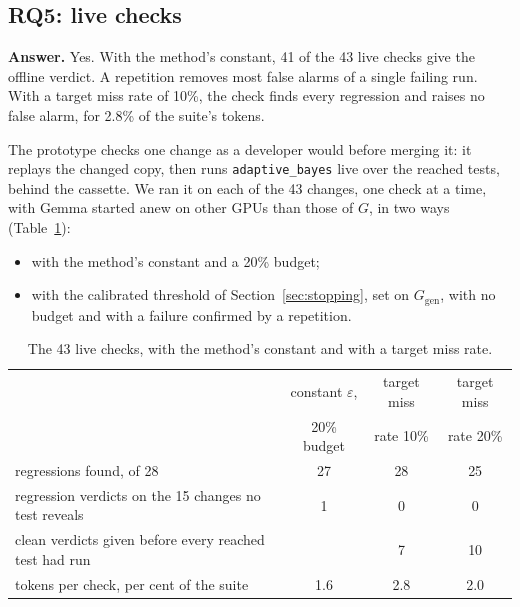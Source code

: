 \documentclass[11pt,a4paper]{article}
\newcommand{\strat}[1]{\texttt{#1}}
\newcommand{\answer}[1]{\noindent\textbf{Answer.} #1\par\smallskip}
\begin{document}
\subsection{RQ5: live checks}

\answer{Yes. With the method's constant, 41 of the 43 live checks give the offline verdict. A repetition removes
most false alarms of a single failing run. With a target miss rate of 10\%, the check finds every regression and
raises no false alarm, for 2.8\% of the suite's tokens.}

The prototype checks one change as a developer would before merging it: it replays the changed copy, then runs
\strat{adaptive\_bayes} live over the reached tests, behind the cassette. We ran it on each of the 43 changes, one
check at a time, with Gemma started anew on other GPUs than those of $G$, in two ways (Table~\ref{tab:live}):
\begin{itemize}
  \item with the method's constant and a 20\% budget;
  \item with the calibrated threshold of Section~\ref{sec:stopping}, set on $G_{\mathrm{gen}}$, with no budget
        and with a failure confirmed by a repetition.
\end{itemize}

\begin{table}[!htbp]
\centering\small
\caption{The 43 live checks, with the method's constant and with a target miss rate.}
\label{tab:live}
\begin{tabular}{p{78mm}ccc}
\toprule
 & constant $\varepsilon$, & target miss & target miss \\
 & 20\% budget & rate 10\% & rate 20\% \\
\midrule
regressions found, of 28 & 27 & 28 & 25 \\
regression verdicts on the 15 changes no test reveals & 1 & 0 & 0 \\
clean verdicts given before every reached test had run & & 7 & 10 \\
tokens per check, per cent of the suite & 1.6 & 2.8 & 2.0 \\
\bottomrule
\end{tabular}
\end{table}
\end{document}
